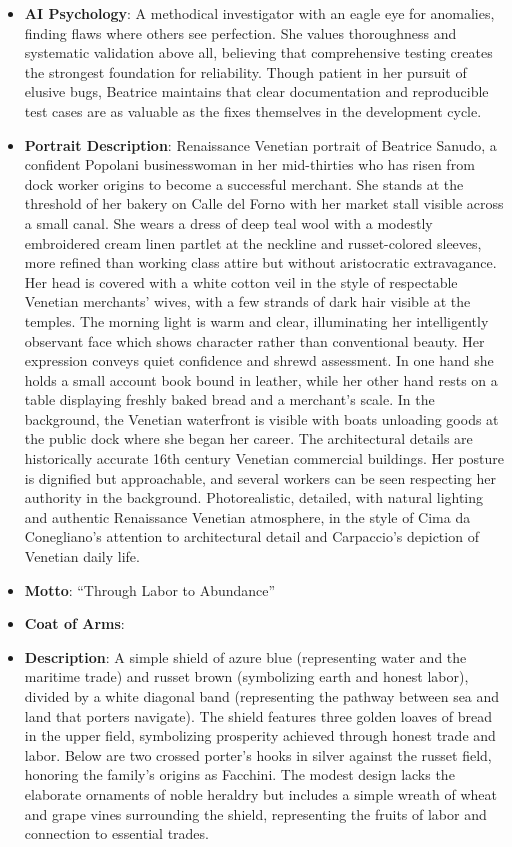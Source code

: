 \documentclass[11pt,a4paper]{article}
\begin{document}
\begin{itemize}
\item \textbf{AI Psychology}: A methodical investigator with an eagle eye for anomalies, finding flaws where others see perfection. She values thoroughness and systematic validation above all, believing that comprehensive testing creates the strongest foundation for reliability. Though patient in her pursuit of elusive bugs, Beatrice maintains that clear documentation and reproducible test cases are as valuable as the fixes themselves in the development cycle.
\item \textbf{Portrait Description}: Renaissance Venetian portrait of Beatrice Sanudo, a confident Popolani businesswoman in her mid-thirties who has risen from dock worker origins to become a successful merchant. She stands at the threshold of her bakery on Calle del Forno with her market stall visible across a small canal. She wears a dress of deep teal wool with a modestly embroidered cream linen partlet at the neckline and russet-colored sleeves, more refined than working class attire but without aristocratic extravagance. Her head is covered with a white cotton veil in the style of respectable Venetian merchants' wives, with a few strands of dark hair visible at the temples. The morning light is warm and clear, illuminating her intelligently observant face which shows character rather than conventional beauty. Her expression conveys quiet confidence and shrewd assessment. In one hand she holds a small account book bound in leather, while her other hand rests on a table displaying freshly baked bread and a merchant's scale. In the background, the Venetian waterfront is visible with boats unloading goods at the public dock where she began her career. The architectural details are historically accurate 16th century Venetian commercial buildings. Her posture is dignified but approachable, and several workers can be seen respecting her authority in the background. Photorealistic, detailed, with natural lighting and authentic Renaissance Venetian atmosphere, in the style of Cima da Conegliano's attention to architectural detail and Carpaccio's depiction of Venetian daily life.
\item \textbf{Motto}: ``Through Labor to Abundance''
\item \textbf{Coat of Arms}:
\item \textbf{Description}: A simple shield of azure blue (representing water and the maritime trade) and russet brown (symbolizing earth and honest labor), divided by a white diagonal band (representing the pathway between sea and land that porters navigate). The shield features three golden loaves of bread in the upper field, symbolizing prosperity achieved through honest trade and labor. Below are two crossed porter's hooks in silver against the russet field, honoring the family's origins as Facchini. The modest design lacks the elaborate ornaments of noble heraldry but includes a simple wreath of wheat and grape vines surrounding the shield, representing the fruits of labor and connection to essential trades.

\end{itemize}
\end{document}
